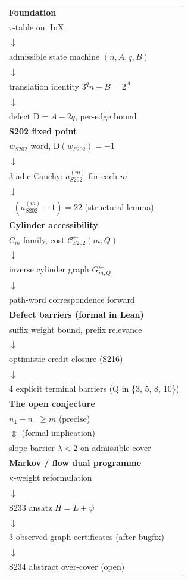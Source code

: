 \documentclass[11pt,a4paper]{article}
\theoremstyle{plain}
\theoremstyle{definition}
\newcommand{\aSat}{a_{S202}^{(m)}}
\newcommand{\wS}{w_{S202}}
\newcommand{\defect}{\mathrm{D}}
\newcommand{\Cback}{\mathcal{C}^{\!\leftarrow}_{S202}}
\newcommand{\InvG}{G^{\!\leftarrow}}
\newcommand{\numOnes}{n_{\mathtt{1}}}
\newcommand{\numNeg}{n_{\!-}}
\DeclareMathOperator{\InX}{InX}
\DeclareMathOperator{\nuthree}{\nu_3}
\begin{document}
\begin{center}\footnotesize
\begin{tabular}{l}
\toprule
\textbf{Foundation} \\
$\tau$-table on $\InX$ \\
$\downarrow$ \\
admissible state machine $(n, A, q, B)$ \\
$\downarrow$ \\
translation identity $3^q n + B = 2^A$ \\
$\downarrow$ \\
defect $\defect = A - 2q$, per-edge bound \\
\midrule
\textbf{S202 fixed point} \\
$\wS$ word, $\defect(\wS) = -1$ \\
$\downarrow$ \\
3-adic Cauchy: $\aSat$ for each $m$ \\
$\downarrow$ \\
$\nuthree(\aSat - 1) = 22$ (structural lemma) \\
\midrule
\textbf{Cylinder accessibility} \\
$C_m$ family, cost $\Cback(m, Q)$ \\
$\downarrow$ \\
inverse cylinder graph $\InvG_{m, Q}$ \\
$\downarrow$ \\
path-word correspondence forward \\
\midrule
\textbf{Defect barriers (formal in Lean)} \\
suffix weight bound, prefix relevance \\
$\downarrow$ \\
optimistic credit closure (S216) \\
$\downarrow$ \\
4 explicit terminal barriers (Q in \{3, 5, 8, 10\}) \\
\midrule
\textbf{The open conjecture} \\
$\numOnes - \numNeg \ge m$ (precise) \\
$\Updownarrow$ (formal implication) \\
slope barrier $\lambda < 2$ on admissible cover \\
\midrule
\textbf{Markov / flow dual programme} \\
$\kappa$-weight reformulation \\
$\downarrow$ \\
S233 ansatz $H = L + \psi$ \\
$\downarrow$ \\
3 observed-graph certificates (after bugfix) \\
$\downarrow$ \\
S234 abstract over-cover (open) \\
\bottomrule
\end{tabular}
\end{center}
\end{document}
